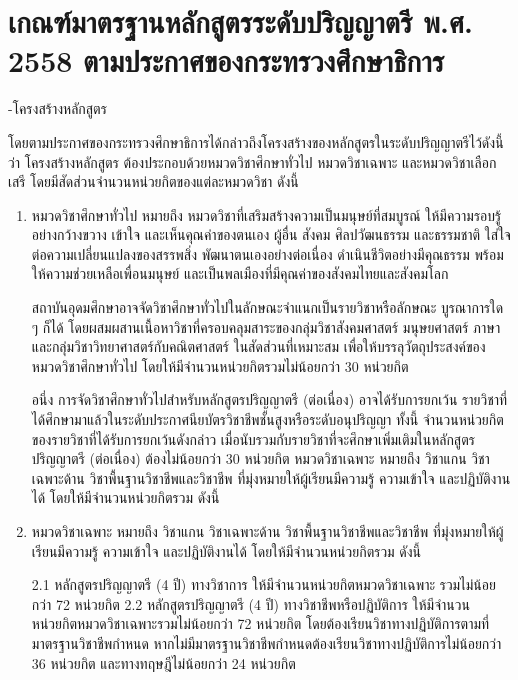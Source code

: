 \section{
เกณฑ์มาตรฐานหลักสูตรระดับปริญญาตรี พ.ศ. 2558 ตามประกาศของกระทรวงศึกษาธิการ
}

-โครงสร้างหลักสูตร

โดยตามประกาศของกระทรวงศึกษาธิการได้กล่าวถึงโครงสร้างของหลักสูตรในระดับปริญญาตรีไว้ดังนี้ว่า โครงสร้างหลักสูตร ต้องประกอบด้วยหมวดวิชาศึกษาทั่วไป หมวดวิชาเฉพาะ และหมวดวิชาเลือกเสรี โดยมีสัดส่วนจํานวนหน่วยกิตของแต่ละหมวดวิชา ดังนี้
\begin{enumerate}
    \item หมวดวิชาศึกษาทั่วไป หมายถึง หมวดวิชาที่เสริมสร้างความเป็นมนุษย์ที่สมบูรณ์ ให้มีความรอบรู้อย่างกว้างขวาง เข้าใจ และเห็นคุณค่าของตนเอง ผู้อื่น สังคม ศิลปวัฒนธรรม และธรรมชาติ ใส่ใจต่อความเปลี่ยนแปลงของสรรพสิ่ง พัฒนาตนเองอย่างต่อเนื่อง ดําเนินชีวิตอย่างมีคุณธรรม พร้อมให้ความช่วยเหลือเพื่อนมนุษย์ และเป็นพลเมืองที่มีคุณค่าของสังคมไทยและสังคมโลก 
    
    สถาบันอุดมศึกษาอาจจัดวิชาศึกษาทั่วไปในลักษณะจําแนกเป็นรายวิชาหรือลักษณะ บูรณาการใด ๆ ก็ได้ โดยผสมผสานเนื้อหาวิชาที่ครอบคลุมสาระของกลุ่มวิชาสังคมศาสตร์ มนุษยศาสตร์ ภาษาและกลุ่มวิชาวิทยาศาสตร์กับคณิตศาสตร์ ในสัดส่วนที่เหมาะสม เพื่อให้บรรลุวัตถุประสงค์ของ หมวดวิชาศึกษาทั่วไป โดยให้มีจํานวนหน่วยกิตรวมไม่น้อยกว่า 30 หน่วยกิต

    อนึ่ง การจัดวิชาศึกษาทั่วไปสําหรับหลักสูตรปริญญาตรี (ต่อเนื่อง) อาจได้รับการยกเว้น รายวิชาที่ได้ศึกษามาแล้วในระดับประกาศนียบัตรวิชาชีพชั้นสูงหรือระดับอนุปริญญา ทั้งนี้ จํานวนหน่วยกิต ของรายวิชาที่ได้รับการยกเว้นดังกล่าว เมื่อนับรวมกับรายวิชาที่จะศึกษาเพิ่มเติมในหลักสูตรปริญญาตรี (ต่อเนื่อง) ต้องไม่น้อยกว่า 30 หน่วยกิต
หมวดวิชาเฉพาะ หมายถึง วิชาแกน วิชาเฉพาะด้าน วิชาพื้นฐานวิชาชีพและวิชาชีพ ที่มุ่งหมายให้ผู้เรียนมีความรู้ ความเข้าใจ และปฏิบัติงานได้ โดยให้มีจํานวนหน่วยกิตรวม ดังนี้

    \item หมวดวิชาเฉพาะ หมายถึง วิชาแกน วิชาเฉพาะด้าน วิชาพื้นฐานวิชาชีพและวิชาชีพ ที่มุ่งหมายให้ผู้เรียนมีความรู้ ความเข้าใจ และปฏิบัติงานได้ โดยให้มีจํานวนหน่วยกิตรวม ดังนี้

    2.1 หลักสูตรปริญญาตรี (4 ปี) ทางวิชาการ ให้มีจํานวนหน่วยกิตหมวดวิชาเฉพาะ รวมไม่น้อยกว่า 72 หน่วยกิต
    2.2 หลักสูตรปริญญาตรี (4 ปี) ทางวิชาชีพหรือปฏิบัติการ ให้มีจํานวน หน่วยกิตหมวดวิชาเฉพาะรวมไม่น้อยกว่า 72 หน่วยกิต โดยต้องเรียนวิชาทางปฏิบัติการตามที่ มาตรฐานวิชาชีพกําหนด หากไม่มีมาตรฐานวิชาชีพกําหนดต้องเรียนวิชาทางปฏิบัติการไม่น้อยกว่า 36 หน่วยกิต และทางทฤษฎีไม่น้อยกว่า 24 หน่วยกิต


\end{enumerate}

